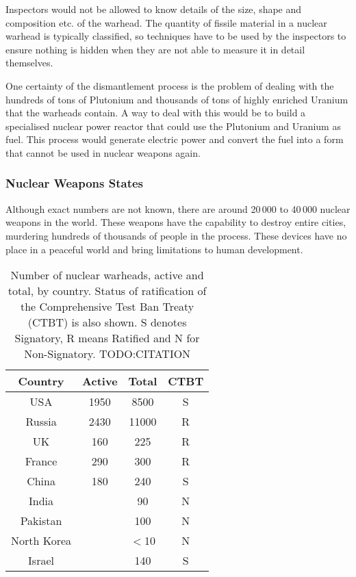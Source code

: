 \documentclass[twoside,titlepage,11pt,twocolumn,a4paper]{article}
\begin{document}
Inspectors would not be allowed to know details of the size, shape and
composition etc. of the warhead. The quantity of fissile material in a
nuclear warhead is typically classified, so techniques have to be used
by the inspectors to ensure nothing is hidden when they are not able
to measure it in detail themselves.

One certainty of the dismantlement process is the problem of dealing
with the hundreds of tons of Plutonium and thousands of tons of highly
enriched Uranium that the warheads contain. A way to deal with this
would be to build a specialised nuclear power reactor that could use
the Plutonium and Uranium as fuel. This process would generate
electric power and convert the fuel into a form that cannot be used in
nuclear weapons again. \citep{moxFuel, feiveson2011, nature2009}

\subsubsection{Nuclear Weapons States}
Although exact numbers are not known, there are around 20\,000 to
40\,000 nuclear weapons in the world. \citep{worldNuclearForces2011,
  norris2010} These weapons have the capability to destroy entire
cities, murdering hundreds of thousands of people in the
process. These devices have no place in a peaceful world and bring
limitations to human development.

\begin{table}
  \begin{tabular}{|c|c|c|c|}
    \hline
    Country	& Active& Total		& CTBT	\\
    \hline
    USA		& 1950 	& 8500		& S	\\
    Russia	& 2430 	& 11000		& R	\\
    UK		& 160 	& 225		& R	\\
    France	& 290	& 300		& R	\\
    China	& 180	& 240		& S	\\
    India	&	& 90		& N	\\
    Pakistan	&	& 100		& N	\\
    North Korea	&	& \(<\)10	& N	\\
    Israel	&	& 140		& S	\\
    \hline
  \end{tabular}
  \caption{Number of nuclear warheads, active and total, by
    country. Status of ratification of the Comprehensive Test Ban
    Treaty (CTBT) is also shown. S denotes Signatory, R means Ratified
    and N for Non-Signatory. TODO:CITATION}
\end{table}
\end{document}
